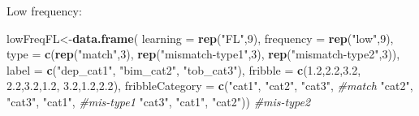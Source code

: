 \documentclass[
]{article}
\newenvironment{Shaded}{\begin{snugshade}}{\end{snugshade}}
\newcommand{\CommentTok}[1]{\textcolor[rgb]{0.56,0.35,0.01}{\textit{#1}}}
\newcommand{\DataTypeTok}[1]{\textcolor[rgb]{0.13,0.29,0.53}{#1}}
\newcommand{\DecValTok}[1]{\textcolor[rgb]{0.00,0.00,0.81}{#1}}
\newcommand{\FloatTok}[1]{\textcolor[rgb]{0.00,0.00,0.81}{#1}}
\newcommand{\KeywordTok}[1]{\textcolor[rgb]{0.13,0.29,0.53}{\textbf{#1}}}
\newcommand{\NormalTok}[1]{#1}
\newcommand{\StringTok}[1]{\textcolor[rgb]{0.31,0.60,0.02}{#1}}
\begin{document}
Low frequency:

\begin{Shaded}
\begin{Highlighting}[]
\NormalTok{lowFreqFL<-}\KeywordTok{data.frame}\NormalTok{(}
           \DataTypeTok{learning =} \KeywordTok{rep}\NormalTok{(}\StringTok{"FL"}\NormalTok{,}\DecValTok{9}\NormalTok{),}
           \DataTypeTok{frequency =} \KeywordTok{rep}\NormalTok{(}\StringTok{"low"}\NormalTok{,}\DecValTok{9}\NormalTok{),}
           \DataTypeTok{type =} \KeywordTok{c}\NormalTok{(}\KeywordTok{rep}\NormalTok{(}\StringTok{"match"}\NormalTok{,}\DecValTok{3}\NormalTok{), }
                    \KeywordTok{rep}\NormalTok{(}\StringTok{"mismatch-type1"}\NormalTok{,}\DecValTok{3}\NormalTok{), }
                    \KeywordTok{rep}\NormalTok{(}\StringTok{"mismatch-type2"}\NormalTok{,}\DecValTok{3}\NormalTok{)),}
           \DataTypeTok{label =} \KeywordTok{c}\NormalTok{(}\StringTok{"dep_cat1"}\NormalTok{, }\StringTok{"bim_cat2"}\NormalTok{, }\StringTok{"tob_cat3"}\NormalTok{),}
           \DataTypeTok{fribble =} \KeywordTok{c}\NormalTok{(}\FloatTok{1.2}\NormalTok{,}\FloatTok{2.2}\NormalTok{,}\FloatTok{3.2}\NormalTok{,}
                       \FloatTok{2.2}\NormalTok{,}\FloatTok{3.2}\NormalTok{,}\FloatTok{1.2}\NormalTok{,}
                       \FloatTok{3.2}\NormalTok{,}\FloatTok{1.2}\NormalTok{,}\FloatTok{2.2}\NormalTok{),}
           \DataTypeTok{fribbleCategory =} \KeywordTok{c}\NormalTok{(}\StringTok{"cat1"}\NormalTok{, }\StringTok{"cat2"}\NormalTok{, }\StringTok{"cat3"}\NormalTok{, }\CommentTok{#match}
                               \StringTok{"cat2"}\NormalTok{, }\StringTok{"cat3"}\NormalTok{, }\StringTok{"cat1"}\NormalTok{, }\CommentTok{#mis-type1}
                               \StringTok{"cat3"}\NormalTok{, }\StringTok{"cat1"}\NormalTok{, }\StringTok{"cat2"}\NormalTok{)) }\CommentTok{#mis-type2}


\end{Highlighting}
\end{Shaded}
\end{document}
